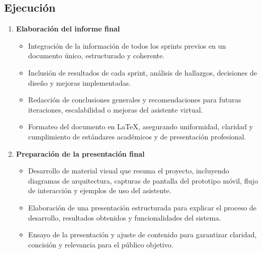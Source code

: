 \subsection{Ejecución}
\begin{enumerate}
      \item \textbf{Elaboración del informe final}
            \begin{itemize}
                  \item Integración de la información de todos los sprints previos en un documento
                        único, estructurado y coherente.
                  \item Inclusión de resultados de cada sprint, análisis de hallazgos, decisiones de
                        diseño y mejoras implementadas.
                  \item Redacción de conclusiones generales y recomendaciones para futuras iteraciones,
                        escalabilidad o mejoras del asistente virtual.
                  \item Formateo del documento en LaTeX, asegurando uniformidad, claridad y
                        cumplimiento de estándares académicos y de presentación profesional.
            \end{itemize}

      \item \textbf{Preparación de la presentación final}
            \begin{itemize}
                  \item Desarrollo de material visual que resuma el proyecto, incluyendo diagramas de
                        arquitectura, capturas de pantalla del prototipo móvil, flujo de interacción y
                        ejemplos de uso del asistente.
                  \item Elaboración de una presentación estructurada para explicar el proceso de
                        desarrollo, resultados obtenidos y funcionalidades del sistema.
                  \item Ensayo de la presentación y ajuste de contenido para garantizar claridad,
                        concisión y relevancia para el público objetivo.
            \end{itemize}


\end{enumerate}
